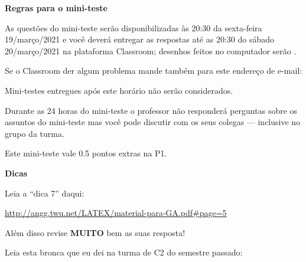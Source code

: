 \documentclass[oneside,12pt]{article}
\begin{document}
\newpage

%

{\bf Regras para o mini-teste}


As questões do mini-teste serão disponibilizadas às 20:30 da
sexta-feira 19/março/2021 e você deverá entregar as respostas
 até as 20:30 do sábado 20/março/2021 na
plataforma Classroom; desenhos feitos no computador serão
.

Se o Classroom der algum problema mande também para este endereço de
e-mail:

\ssk


\ssk

Mini-testes entregues após este horário não serão considerados.


Durante as 24 horas do mini-teste o professor não responderá perguntas
sobre os assuntos do mini-teste mas você pode discutir com os seus
colegas --- inclusive no grupo da turma.

Este mini-teste vale 0.5 pontos extras na P1.


\newpage


{\bf Dicas}

\ssk

Leia a ``dica 7'' daqui:

\ssk

\url{http://angg.twu.net/LATEX/material-para-GA.pdf\#page=5}

\bsk

Além disso revise {\bf MUITO} bem as suas resposta!

Leia esta bronca que eu dei na turma de C2 do semestre passado:
\end{document}
